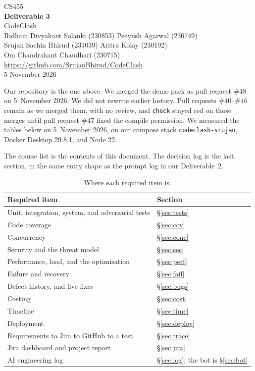 \documentclass[11pt,a4paper]{article}
\begin{document}
\begin{center}
{\large CS455}\\[0.3em]
{\LARGE\bfseries Deliverable 3}\\[0.4em]
CodeClash\\[0.65em]
{\small
Ridham Divyakant Solanki (230853) \quad
Peeyush Agarwal (230749)\\[0.15em]
Srujan Sachin Bhirud (231039) \quad
Aritra Kolay (230192)\\[0.15em]
Om Chandrakant Chaudhari (230715)\\[0.45em]
}
\url{https://github.com/SrujanBhirud/CodeClash}\\[0.1em]
5 November 2026
\end{center}

Our repository is the one above. We merged the demo pack as pull request \#48 on 5~November 2026. We did not rewrite earlier history. Pull requests \#40--\#46 remain as we merged them, with no review, and \texttt{check} stayed red on those merges until pull request \#47 fixed the compile permission. We measured the tables below on 5~November 2026, on our compose stack \texttt{codeclash-srujan}, Docker Desktop 29.8.1, and Node 22.

The course list is the contents of this document. The decision log is the last section, in the same entry shape as the prompt log in our Deliverable~2.

\begin{table}[ht]
\centering
\caption{Where each required item is.}
\label{tab:map}
{\small
\begin{tabularx}{\textwidth}{@{}Y l@{}}
\toprule
Required item & Section \\
\midrule
Unit, integration, system, and adversarial tests & \S\ref{sec:tests} \\
Code coverage & \S\ref{sec:cov} \\
Concurrency & \S\ref{sec:conc} \\
Security and the threat model & \S\ref{sec:sec} \\
Performance, load, and the optimisation & \S\ref{sec:perf} \\
Failure and recovery & \S\ref{sec:fail} \\
Defect history, and five fixes & \S\ref{sec:bugs} \\
Costing & \S\ref{sec:cost} \\
Timeline & \S\ref{sec:time} \\
Deployment & \S\ref{sec:deploy} \\
Requirements to Jira to GitHub to a test & \S\ref{sec:trace} \\
Jira dashboard and project report & \S\ref{sec:jira} \\
AI engineering log & \S\ref{sec:log}; the bot is \S\ref{sec:bot} \\
\bottomrule
\end{tabularx}
}
\end{table}
\end{document}

